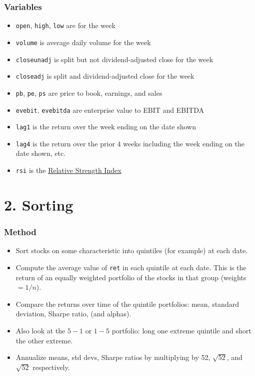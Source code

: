 \documentclass[10pt]{beamer}
\begin{document}
\begin{frame}[fragile]\frametitle{Variables}
\begin{itemize}
        \item \verb!open!, \verb!high!, \verb!low! are for the week
        \item \verb!volume! is average daily volume for the week
        \item \verb!closeunadj! is split but not dividend-adjusted close for the week
        \item \verb!closeadj! is split and dividend-adjusted close for the week
        \item \verb!pb!, \verb!pe!, \verb!ps! are price to book, earnings, and sales
        \item \verb!evebit!, \verb!evebitda! are enterprise value to EBIT and EBITDA
        \item \verb!lag1! is the return over the week ending on the date shown
        \item \verb!lag4! is the return over the prior 4 weeks including the week ending on the date shown, etc.
        \item \verb!rsi! is the \href{https://en.wikipedia.org/wiki/Relative_strength_index}{Relative Strength Index}
\end{itemize}
\end{frame}

\section{2. Sorting}

\begin{frame}[fragile]\frametitle{Method}
\begin{itemize}
\item Sort stocks on some characteristic into quintiles (for example) \alert{at each date}.
\item Compute the average value of \verb!ret! in each quintile at each date.  This is the return of an equally weighted portfolio of the stocks in that group (weights $=1/n$).
\item Compare the returns over time of the quintile portfolios: mean, standard deviation, Sharpe ratio, (and alphas).
\item Also look at the $5-1$ or $1-5$ portfolio: long one extreme quintile and short the other extreme.
\item Annualize means, std devs, Sharpe ratios by multiplying by 52, $\sqrt{52}$, and $\sqrt{52}$ respectively.
\end{itemize}
\end{frame}
\end{document}
